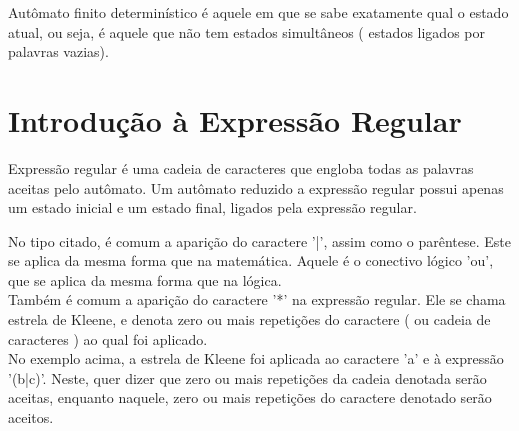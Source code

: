 \documentclass[a4paper,10pt]{article} %
\begin{document}
    Autômato finito determinístico é aquele em que se sabe exatamente qual o estado atual, ou seja, é aquele que não tem estados simultâneos ( estados ligados por palavras vazias).
\begin{center}
\end{center}

\section{Introdução à Expressão Regular}

    Expressão regular é uma cadeia de caracteres que engloba todas as palavras aceitas pelo autômato. Um autômato reduzido a expressão regular possui apenas um estado inicial e um estado final, ligados pela expressão regular.
\begin{center}
\end{center}

    No tipo citado, é comum a aparição do caractere '|', assim como o parêntese. Este se aplica da mesma forma que na matemática. Aquele é o conectivo lógico 'ou', que se aplica da mesma forma que na lógica.\\Também é comum a aparição do caractere '*' na expressão regular. Ele se chama estrela de Kleene, e denota zero ou mais repetições do caractere ( ou cadeia de caracteres ) ao qual foi aplicado.\\No exemplo acima, a estrela de Kleene foi aplicada ao caractere 'a' e à expressão '(b|c)'. Neste, quer dizer que zero ou mais repetições da cadeia denotada serão aceitas, enquanto naquele, zero ou mais repetições do caractere denotado serão aceitos.
\end{document}
